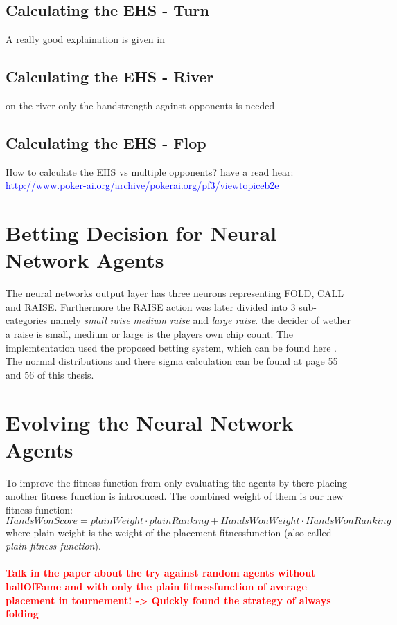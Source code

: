 \subsection{Calculating the EHS - Turn}
A really good explaination is given in \cite{opp_mod}
\subsection{Calculating the EHS - River}
on the river only the handstrength against opponents is needed
\subsection{Calculating the EHS - Flop}
How to calculate the EHS vs multiple opponents? have a read hear:\\
\href{http://www.poker-ai.org/archive/pokerai.org/pf3/viewtopiceb2e.html?f=3&t=444&start=20&st=0&sk=t&sd=a&hilit=lut}{\textcolor{blue}{http://www.poker-ai.org/archive/pokerai.org/pf3/viewtopiceb2e}}

\section{Betting Decision for Neural Network Agents}
The neural networks output layer has three neurons representing FOLD, CALL and RAISE. Furthermore the RAISE action was later divided into 3 sub-categories namely \textit{small raise} \textit{medium raise} and \textit{large raise}. the decider of wether a raise is small, medium or large is the players own chip count. The implemtentation used the proposed betting system, which can be found here \cite{master_evo}. The normal distributions and there sigma calculation can be found at page 55 and 56 of this thesis.
\section{Evolving the Neural Network Agents}
To improve the fitness function from only evaluating the agents by there placing another fitness function is introduced. The combined weight of them is our new fitness function:
\begin{equation}
HandsWonScore = plainWeight \cdot plainRanking + HandsWonWeight \cdot HandsWonRanking
\end{equation}
where plain weight is the weight of the placement fitnessfunction (also called \textit{plain fitness function}).\\\\
\textbf{\textcolor{red}{Talk in the paper about the try against random agents without hallOfFame and with only the plain fitnessfunction of average placement in tournement! -> Quickly found the strategy of always folding}}

